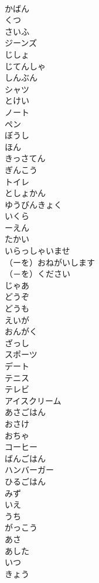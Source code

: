 \documentclass[8pt]{extreport}
\begin{document}
\begin{CJK}{UTF8}{min}
\\	かばん	
\\	くつ	
\\	さいふ	
\\	ジーンズ	
\\	じしょ	
\\	じてんしゃ	
\\	しんぶん	
\\	シャツ	
\\	とけい	
\\	ノート	
\\	ペン	
\\	ぼうし	
\\	ほん	
\\	きっさてん	
\\	ぎんこう	
\\	トイレ	
\\	としょかん	
\\	ゆうびんきょく	
\\	いくら	
\\	ーえん	
\\	たかい	
\\	いらっしゃいませ	
\\	（ーを）おねがいします	
\\	（－を）ください	
\\	じゃあ	
\\	どうぞ	
\\	どうも	
\\	えいが	
\\	おんがく	
\\	ざっし	
\\	スポーツ	
\\	デート	
\\	テニス	
\\	テレビ	
\\	アイスクリーム	
\\	あさごはん	
\\	おさけ	
\\	おちゃ	
\\	コーヒー	
\\	ばんごはん	
\\	ハンバーガー	
\\	ひるごはん	
\\	みず	
\\	いえ	
\\	うち	
\\	がっこう	
\\	あさ	
\\	あした	
\\	いつ	
\\	きょう	

\end{CJK}
\end{document}
